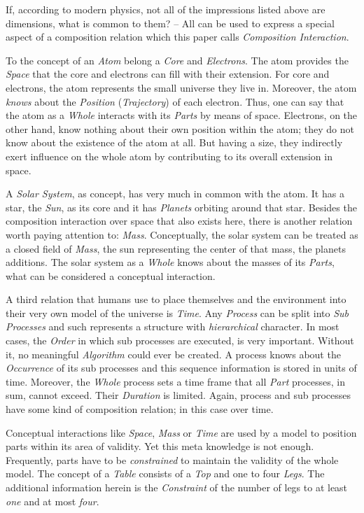 If, according to modern physics, not all of the impressions listed above are
dimensions, what is common to them? -- All can be used to express a special aspect
of a composition relation which this paper calls \emph{Composition Interaction}.

To the concept of an \emph{Atom} belong a \emph{Core} and \emph{Electrons}. The
atom provides the \emph{Space} that the core and electrons can fill with their
extension. For core and electrons, the atom represents the small universe they live
in. Moreover, the atom \emph{knows} about the \emph{Position} (\emph{Trajectory})
of each electron. Thus, one can say that the atom as a \emph{Whole} interacts with
its \emph{Parts} by means of space. Electrons, on the other hand, know nothing
about their own position within the atom; they do not know about the existence of
the atom at all. But having a size, they indirectly exert influence on the whole
atom by contributing to its overall extension in space.

A \emph{Solar System}, as concept, has very much in common with the atom. It has a
star, the \emph{Sun}, as its core and it has \emph{Planets} orbiting around that
star. Besides the composition interaction over space that also exists here, there
is another relation worth paying attention to: \emph{Mass}. Conceptually, the
solar system can be treated as a closed field of \emph{Mass}, the sun representing
the center of that mass, the planets additions. The solar system as a \emph{Whole}
knows about the masses of its \emph{Parts}, what can be considered a conceptual
interaction.

A third relation that humans use to place themselves and the environment into their
very own model of the universe is \emph{Time}. Any \emph{Process} can be split into
\emph{Sub Processes} and such represents a structure with \emph{hierarchical}
character. In most cases, the \emph{Order} in which sub processes are executed, is
very important. Without it, no meaningful \emph{Algorithm} could ever be created.
A process knows about the \emph{Occurrence} of its sub processes and this sequence
information is stored in units of time. Moreover, the \emph{Whole} process sets a
time frame that all \emph{Part} processes, in sum, cannot exceed. Their \emph{Duration}
is limited. Again, process and sub processes have some kind of composition relation;
in this case over time.

Conceptual interactions like \emph{Space}, \emph{Mass} or \emph{Time} are used by a
model to position parts within its area of validity. Yet this meta knowledge is not
enough. Frequently, parts have to be \emph{constrained} to maintain the validity of
the whole model. The concept of a \emph{Table} consists of a \emph{Top} and one to
four \emph{Legs}. The additional information herein is the \emph{Constraint} of the
number of legs to at least \emph{one} and at most \emph{four}.

